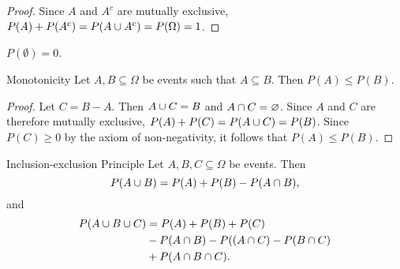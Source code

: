 \begin{proof}
    Since $A$ and $A^{c}$ are mutually exclusive, $P(A) + P(A^{c}) = P(A \cup A^{c}) = P(\Omega) = 1$.
\end{proof}

\begin{cor}
    $P(\emptyset) = 0$.
\end{cor}

\begin{prop}Monotonicity\label{probability-monotonicity}\proofbreak
    Let $A, B \subseteq \Omega$ be events such that $A \subseteq B$. Then $P(A) \leq P(B)$.
\end{prop}

\begin{proof}
    Let $C = B - A$. Then $A \cup C = B$ and $A \cap C = \varnothing$. Since $A$ and $C$ are therefore mutually exclusive, $P(A) + P(C) = P(A \cup C) = P(B)$. Since $P(C) \geq 0$ by the axiom of non-negativity, it follows that $P(A) \leq P(B)$.
\end{proof}

\begin{thm}{Inclusion-exclusion Principle}\label{inclusion-exclusion}
    Let $A, B, C \subseteq \Omega$ be events. Then
    \[P(A \cup B) = P(A) + P(B) - P(A \cap B),\]
    and
    \begin{align*}
        P(A \cup B \cup C) &= P(A) + P(B) + P(C) \\
                               &- P(A \cap B) - P((A \cap C) - P(B \cap C) \\
                               &+ P(A \cap B \cap C).
    \end{align*}
\end{thm}


